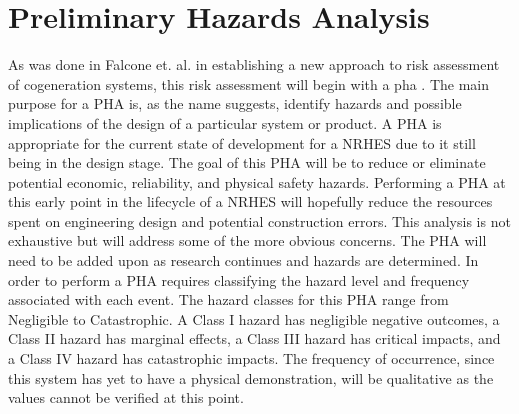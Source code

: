 \documentclass[12pt]{UIdahoMastersThesis}
\begin{document}
\section{Preliminary Hazards Analysis}
As was done in Falcone et. al. in establishing a new approach to risk assessment of cogeneration systems, this risk assessment will begin with a \ac{pha} \cite{Falcone}. The main purpose for a PHA is, as the name suggests, identify hazards and possible implications of the design of a particular system or product.  A PHA is appropriate for the current state of development for a NRHES due to it still being in the design stage. The goal of this PHA will be to reduce or eliminate potential economic, reliability, and physical safety hazards. Performing a PHA at this early point in the lifecycle of a NRHES will hopefully reduce the resources spent on engineering design and potential construction errors. This analysis is not exhaustive but will address some of the more obvious concerns. The PHA will need to be added upon as research continues and hazards are determined.
	In order to perform a PHA requires classifying the hazard level and frequency associated with each event. The hazard classes for this PHA range from Negligible to Catastrophic. A Class I hazard has negligible negative outcomes, a Class II hazard has marginal effects, a Class III hazard has critical impacts, and a Class IV hazard has catastrophic impacts\cite{ostrom2012risk}.  The frequency of occurrence, since this system has yet to have a physical demonstration, will be qualitative as the values cannot be verified at this point.
\end{document}
